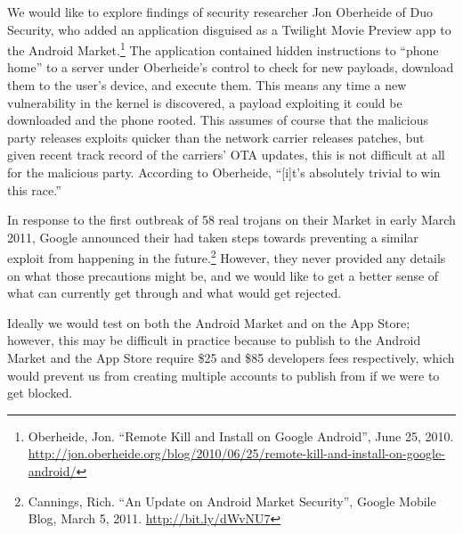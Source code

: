 \documentclass[11pt]{article}
\begin{document}
We would like to explore findings of security researcher Jon Oberheide of Duo
Security, who added an application disguised as a Twilight Movie Preview app to
the Android Market.\footnote{Oberheide, Jon. ``Remote Kill and Install on
Google Android'', June 25, 2010.
\url{http://jon.oberheide.org/blog/2010/06/25/remote-kill-and-install-on-google-android/}}
The application contained hidden instructions to ``phone home'' to a server
under Oberheide's control to check for new payloads, download them to the
user's device, and execute them. This means any time a new vulnerability in the
kernel is discovered, a payload exploiting it could be downloaded and the phone
rooted. This assumes of course that the malicious party releases exploits
quicker than the network carrier releases patches, but given recent track
record of the carriers' OTA updates, this is not difficult at all for the
malicious party. According to Oberheide, ``[i]t's absolutely trivial to win
this race.''

In response to the first outbreak of 58 real trojans on their Market in early
March 2011, Google announced their had taken steps towards preventing a similar
exploit from happening in the future.\footnote{Cannings, Rich. ``An Update on
Android Market Security'', Google Mobile Blog, March 5, 2011.
\url{http://bit.ly/dWvNU7}} However, they never provided any details on what
those precautions might be, and we would like to get a better sense of what can
currently get through and what would get rejected.

Ideally we would test on both the Android Market and on the App Store; however,
this may be difficult in practice because to publish to the Android Market and
the App Store require \$25 and \$85 developers fees respectively, which would
prevent us from creating multiple accounts to publish from if we were to get
blocked.
\end{document}
